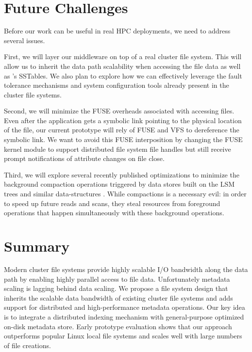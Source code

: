 \section{Future Challenges}
\label{futurework}

Before our work can be useful in real HPC deployments, we need to address
several issues. 

First, we will layer our middleware on top of a real cluster file system.
This will allow us to inherit the data path scalability when accessing the 
file data as well as \ldb's SSTables. We also plan to explore how
we can effectively leverage the fault tolerance mechanisms and system
configuration tools already present in the cluster file systems.

Second, we will minimize the FUSE overheads associated with accessing files.
Even after the application gets a symbolic link pointing to the physical
location of the file, our current prototype will rely of FUSE and VFS to
dereference the symbolic link. We want to avoid this FUSE
interposition by changing the FUSE kernel module to support distributed file
system file handles but still receive prompt notifications of attribute changes
on file close.

Third, we will explore several recently published optimizations to minimize the
background compaction operations triggered by data stores built on the LSM
trees and similar data-structures \cite{Bender2007, tokufs, blsm}. 
While compactions is a necessary evil: in order to speed up future reads and
scans, they steal resources from foreground operations that happen
simultaneously with these background operations.

\section{Summary}
\label{summary}

Modern cluster file systems provide highly scalable I/O bandwidth along the
data path by enabling highly parallel access to file data.
Unfortunately metadata scaling is lagging behind data scaling.
We propose a file system design that 
inherits the scalable data bandwidth of existing cluster file systems
and adds support for distributed and high-performance metadata operations.
Our key idea is to integrate a distributed indexing mechanism with general-purpose
optimized on-disk metadata store.
Early prototype evaluation shows that our approach outperforms popular Linux
local file systems and scales well with large numbers of file creations. 




